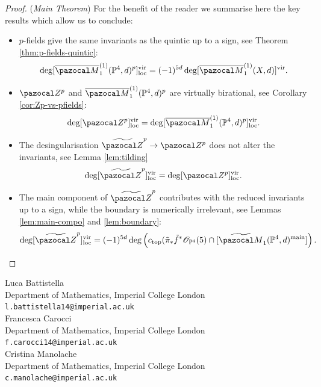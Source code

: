 \documentclass[11pt]{amsart}
\newcommand{\Mone}[3]{\overline{\pazocal M}^{(1)}_{#1}(#2,#3)}
\newcommand{\PP}{\mathbb P}
\newcommand{\OO}{\mathcal O}
\renewcommand{\to}{\rightarrow}
\newcommand{\Zp}{\pazocal Z^p}
\newcommand{\tZp}{\widetilde{\pazocal Z}^p}
\newcommand{\virloc}[1]{[#1]^{\rm{vir}}_{\rm{loc}}}
\theoremstyle{plain}
\theoremstyle{definition}
\begin{document}
\begin{proof}(\emph{Main Theorem})
For the benefit of the reader we summarise here the key results which allow us to conclude:
\begin{itemize}
\item $p$-fields give the same invariants as the quintic up to a sign, see Theorem \ref{thm:p-fields-quintic}: \[\deg[\Mone{1}{\PP^4}{d}^p]^{\rm{vir}}_{\rm{loc}}= (-1)^{5d}\deg[\Mone{1}{X}{d}]^{\rm{vir}}.\]
\item $\Zp$ and $\Mone{1}{\PP^4}{d}^p$ are virtually birational, see Corollary \ref{cor:Zp-vs-pfields}:
\[\deg\virloc{\Zp}=\deg\virloc{\Mone{1}{\PP^4}{d}^p}.\]
\item The desingularisation $\tZp\to \Zp$ does not alter the invariants, see Lemma \ref{lem:tilding} \[\deg\virloc{\tZp}=\deg\virloc{\Zp}.\]
\item The main component of $\tZp$ contributes with the reduced invariants up to a sign, while the boundary is numerically irrelevant, see Lemmas \ref{lem:main-compo} and \ref{lem:boundary}:
\[\deg\virloc{\tZp}=(-1)^{5d}\deg\left(c_{\rm{top}}(\tilde\pi_*\tilde f^*\OO_{\PP^4}(5)\cap[\widetilde{\pazocal M}_1(\PP^4,d)^{\rm{main}}]\right).\]
\end{itemize}


\end{proof}




\bigskip\bigskip

\noindent Luca Battistella\\
Department of Mathematics, Imperial College London \\
\texttt{l.battistella14@imperial.ac.uk}\\

\noindent Francesca Carocci \\
Department of Mathematics, Imperial College London \\
\texttt{f.carocci14@imperial.ac.uk}\\

\noindent Cristina Manolache \\
Department of Mathematics, Imperial College London \\
\texttt{c.manolache@imperial.ac.uk}
\end{document}
